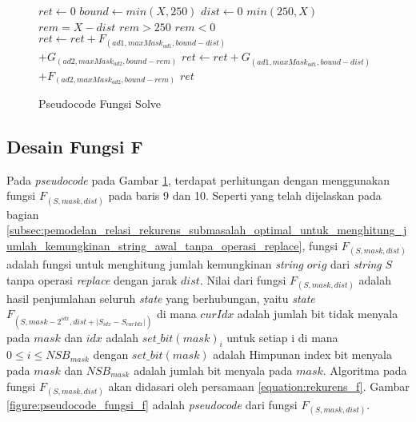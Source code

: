 \begin{figure}
	\begin{mdframed}
		\begin{codebox}
			\li $ret \gets 0$
			\li	$bound \gets min(X, 250)$
			\li \For $dist \gets 0$ \To $min(250, X)$ \Do
			\li		$rem = X - dist$
			\li		\If $rem > 250$ \Then
			\li			\proc{continue}
					\End
			\li		\If $rem < 0$ \Then
			\li			\proc{break}
					\End
			\li 	$ret \gets ret + F_{(ad1, maxMask_{ad1}, bound - dist)}$\\ \quad \quad $+ G_{(ad2, maxMask_{ad2}, bound - rem)}$
			\li 	$ret \gets ret + G_{(ad1, maxMask_{ad1}, bound - dist)} $\\ \quad \quad $ + F_{(ad2, maxMask_{ad2}, bound - rem)}$				
				\End
			\li 	\Return $ret$	
		\end{codebox}
	\end{mdframed}
	\caption{Pseudocode Fungsi Solve}
	\label{figure:pseudocode_fungsi_solve}
\end{figure}

\subsection{Desain Fungsi F}
\label{subsec:desain_fungsi_f}

Pada \textit{pseudocode} pada Gambar \ref{figure:pseudocode_fungsi_solve}, terdapat perhitungan dengan menggunakan fungsi $F_{(S, mask, dist)}$ pada baris 9 dan 10. Seperti yang telah dijelaskan pada bagian \ref{subsec:pemodelan_relasi_rekurens_submasalah_optimal_untuk_menghitung_jumlah_kemungkinan_string_awal_tanpa_operasi_replace}, fungsi $F_{(S, mask, dist)}$ adalah fungsi untuk menghitung jumlah kemungkinan \textit{string} $orig$ dari \textit{string} $S$ tanpa operasi \textit{replace} dengan jarak $dist$. Nilai dari fungsi $F_{(S, mask, dist)}$ adalah hasil penjumlahan seluruh \textit{state} yang berhubungan, yaitu \textit{state} $F_{(S, mask - 2^{idx}, dist +|S_{idx} - S_{curIdx}|)}$ di mana $curIdx$ adalah jumlah bit tidak menyala pada $mask$ dan $idx$ adalah $set\_bit(mask)_{i}$ untuk setiap i di mana $0 \leq i \leq NSB_{mask}$ dengan $set\_bit(mask)$ adalah Himpunan index bit menyala pada $mask$ dan $NSB_{mask}$ adalah jumlah bit menyala pada $mask$. Algoritma pada fungsi $F_{(S, mask, dist)}$ akan didasari oleh persamaan \ref{equation:rekurens_f}. Gambar \ref{figure:pseudocode_fungsi_f} adalah \textit{pseudocode} dari fungsi $ F_{(S, mask, dist)} $.

